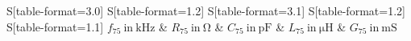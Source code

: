 \begin{table}
    \centering
    \caption{Beim Kurzschließen des $75\Omega$-Kables gemessene Werte für $R_{75},C_{75},L_{75}$ und daraus berechnete Werte für $G_{75}$ bei den jeweils eingestellten Frequenzen $f$}
    \label{tab:RLC75Werte}
    \begin{tabular}{
	S[table-format=3.0]
	S[table-format=1.2]
	S[table-format=3.1]
	S[table-format=1.2]
	S[table-format=1.1]
	}
	\toprule
	{$f_{75} \ \mathrm{in} \ \si{\kilo\hertz}$}		& {$R_{75} \ \mathrm{in} \ \si{\ohm}$}		& 
	{$C_{75} \ \mathrm{in} \ \si{\pico\farad}$}		& {$L_{75} \ \mathrm{in} \ \si{\micro\henry}$}		& 
	{$G_{75} \ \mathrm{in} \ \si{\milli\siemens}$}		\\ 
	\midrule
    
    \bottomrule
    \end{tabular}
    \end{table}
